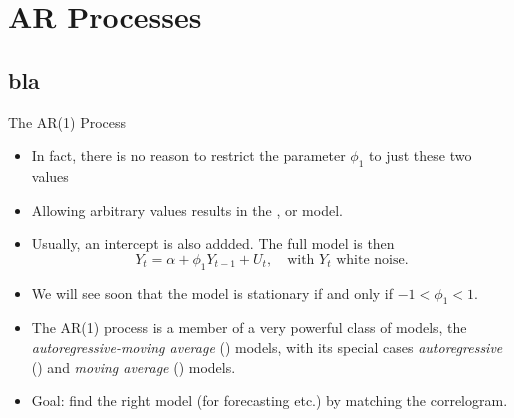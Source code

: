 

\frame{\titlepage}


\section{AR Processes}\subsection*{bla}
\begin{frame}{The AR(1) Process}
\begin{itemize}
\item In fact, there is no reason to restrict the parameter $\phi_1$ to just these two values
\item Allowing arbitrary values results in the , or  model.
\item Usually, an intercept is also addded. The full model is then
\begin{equation*}
Y_t=\alpha +\phi_1 Y_{t-1}+ U_t, \quad  \text{with $Y_t$ white noise.}
\end{equation*}
\item We will see soon that the model is stationary if and only if $-1<\phi_1 <1$.
\item The AR(1) process is a member of a very powerful class of models, the \emph{\color{red}%
autoregressive-moving average} () models, with its special cases
\emph{\color{red}autoregressive} () and \emph{\color{red}moving average} () models.

\item Goal: find the right model (for forecasting etc.) by matching the correlogram.
\end{itemize}
\end{frame}
